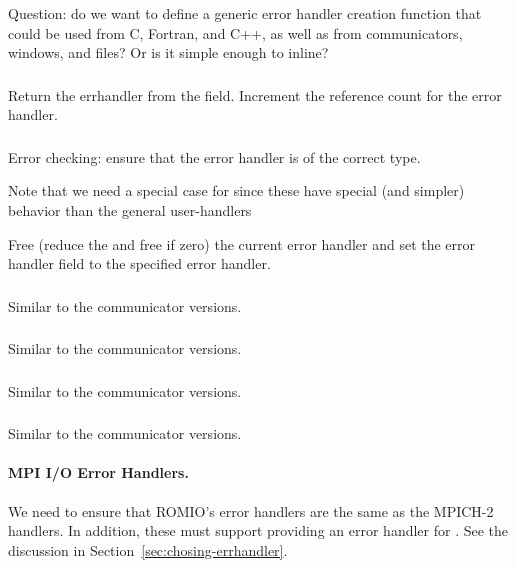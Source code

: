 \documentclass{article}
\begin{document}
Question: do we want to define a generic error handler
creation function that could be used from C, Fortran, and C++, as well as from
communicators, windows, and files?  Or is it simple enough to inline?

\subsubsection{}
Return the errhandler from the  field.  Increment the 
reference count for the error handler.

\subsubsection{}
Error checking: ensure that the error handler is of the correct type.  

Note that we need a special case for  since
these have special (and simpler) behavior than the general user-handlers

Free (reduce the  and free if zero) the current error handler
and set the error handler field to the specified error handler.

\subsubsection{}
Similar to the communicator versions.

\subsubsection{}
Similar to the communicator versions.

\subsubsection{}
Similar to the communicator versions.

\subsubsection{}
Similar to the communicator versions.

\paragraph{MPI I/O Error Handlers.}
We need to ensure that ROMIO's error handlers are the same as the MPICH-2
handlers.  In addition, these must support providing an error handler for
.  See the discussion in
Section~\ref{sec:chosing-errhandler}. 
\end{document}
